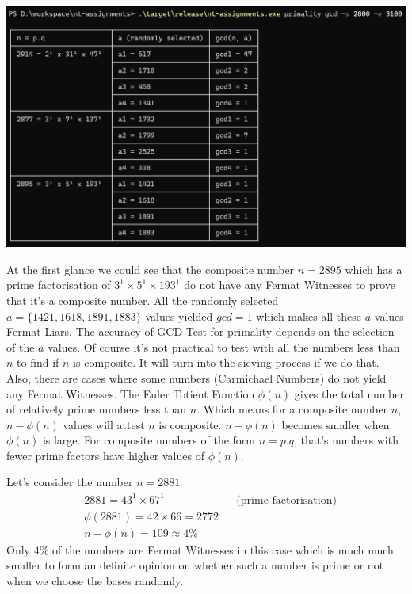 \documentclass[11pt,a4paper]{article}
\begin{document}
\begin{enumerate}[1.]
\begin{flushleft}
			\begin{minipage}{\linewidth}
				\begin{center}
					\includegraphics[scale=.45]{gcd_test_3.png}
				\end{center}
			\end{minipage}
			\bigbreak
			At the first glance we could see that the composite number $n = 2895$ which has a prime factorisation of $3^1 \times 5^1 \times 193^1$ do not have any Fermat Witnesses to prove that it's a composite number. All the randomly selected $a = \{1421, 1618, 1891, 1883\}$ values yielded  $gcd = 1$ which makes all these $a$ values Fermat Liars. \bigbreak
			The accuracy of GCD Test for primality depends on the selection of the $a$ values. Of course it's not practical to test with all the numbers less than $n$ to find if $n$ is composite. It will turn into the sieving process if we do that. Also, there are cases where some numbers (Carmichael Numbers) do not yield any Fermat Witnesses. The Euler Totient Function $\phi(n)$ gives the total number of relatively prime numbers less than $n$. Which means for a composite number $n$, $n - \phi(n)$ values will attest $n$ is composite. $n - \phi(n)$ becomes smaller when $\phi(n)$ is large. For composite numbers of the form $n = p.q$, that's numbers with fewer prime factors have higher values of $\phi(n)$. \bigskip
			       
			Let's consider the number $n = 2881$
			\begin{align}
				& 2881 = 43^1 \times 67^1 &&\text{(prime factorisation)}\nonumber\\
				& \phi(2881) = 42 \times 66 = 2772 \nonumber\\
				& n - \phi(n) = 109 \approx 4\% \nonumber
			\end{align}
		Only $4\%$ of the numbers are Fermat Witnesses in this case which is much much smaller to form an definite opinion on whether such a number is prime or not when we choose the bases randomly.
		

\end{flushleft}
\end{enumerate}
\end{document}
